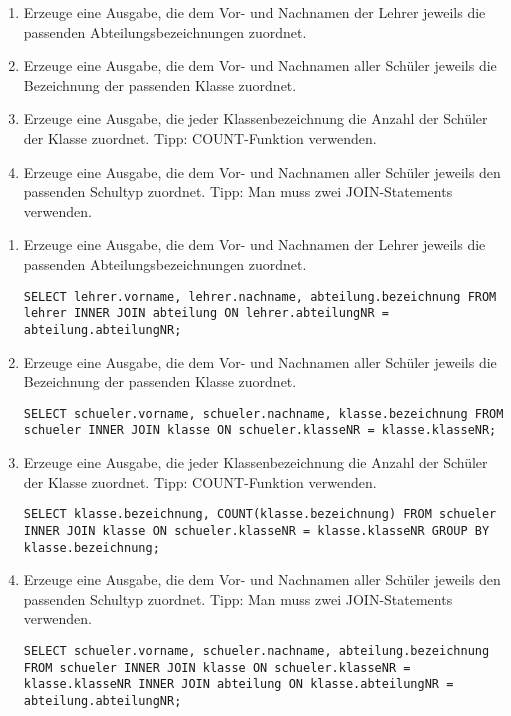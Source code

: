 \begin{Exercise}[title={Bearbeite folgende Aufgaben}, label=Join]
	\begin{enumerate}
		\item Erzeuge eine Ausgabe, die dem Vor- und Nachnamen der Lehrer jeweils die passenden Abteilungsbezeichnungen zuordnet.
		\item Erzeuge eine Ausgabe, die dem Vor- und Nachnamen aller Schüler jeweils die Bezeichnung der passenden Klasse zuordnet.
		\item Erzeuge eine Ausgabe, die jeder Klassenbezeichnung die Anzahl der Schüler der Klasse zuordnet. Tipp: COUNT-Funktion verwenden.
		\item Erzeuge eine Ausgabe, die dem Vor- und Nachnamen aller Schüler jeweils den passenden Schultyp zuordnet. Tipp: Man muss zwei JOIN-Statements verwenden.
	\end{enumerate}
\end{Exercise}
\begin{Answer}[ref=Join]
	\begin{enumerate}
		\item Erzeuge eine Ausgabe, die dem Vor- und Nachnamen der Lehrer jeweils die passenden Abteilungsbezeichnungen zuordnet.

		\lstinline[breaklines=true]!SELECT lehrer.vorname, lehrer.nachname, abteilung.bezeichnung FROM lehrer INNER JOIN abteilung ON lehrer.abteilungNR = abteilung.abteilungNR;!
		\item Erzeuge eine Ausgabe, die dem Vor- und Nachnamen aller Schüler jeweils die Bezeichnung der passenden Klasse zuordnet.

		\lstinline[breaklines=true]!SELECT schueler.vorname, schueler.nachname, klasse.bezeichnung FROM schueler INNER JOIN klasse ON schueler.klasseNR = klasse.klasseNR;!
		\item Erzeuge eine Ausgabe, die jeder Klassenbezeichnung die Anzahl der Schüler der Klasse zuordnet. Tipp: COUNT-Funktion verwenden.

		\lstinline[breaklines=true]!SELECT klasse.bezeichnung, COUNT(klasse.bezeichnung) FROM schueler INNER JOIN klasse ON schueler.klasseNR = klasse.klasseNR GROUP BY klasse.bezeichnung;!
		\item Erzeuge eine Ausgabe, die dem Vor- und Nachnamen aller Schüler jeweils den passenden Schultyp zuordnet. Tipp: Man muss zwei JOIN-Statements verwenden.

		\lstinline[breaklines=true]!SELECT schueler.vorname, schueler.nachname, abteilung.bezeichnung FROM schueler INNER JOIN klasse ON schueler.klasseNR = klasse.klasseNR INNER JOIN abteilung ON klasse.abteilungNR = abteilung.abteilungNR;!
	\end{enumerate}
\end{Answer}